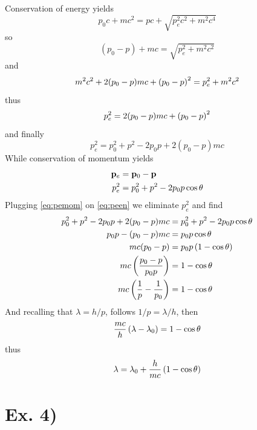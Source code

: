 \documentclass[oneside, 10pt, notitlepage]{book}
\begin{document}
Conservation of energy yields
\begin{equation}
    p_0 c + mc^2 = p c + \sqrt{p_e^2 c^2 + m^2 c^4}
\end{equation}
so
\begin{equation}
    (p_0-p) + mc = \sqrt{p_e^2  + m^2 c^2}
\end{equation}
and 
\begin{equation}
    m^2 c^2 + 2(p_0 - p)mc + \left(p_0 - p\right)^2 = p_e^2  + m^2 c^2
\end{equation}
thus 
\begin{equation}
    p_e^2 = 2(p_0 - p)mc + \left(p_0 - p\right)^2  
\end{equation}
and finally 
\begin{equation}\label{eq:peen}
    p_e^2 = p_0^2 + p^2 - 2p_0p + 2(p_0 - p)mc
\end{equation}
While conservation of momentum yields 
\begin{equation}\label{eq:pemom}
\begin{split}
    \vb{p}_e &= \vb{p}_0 - \vb{p} \\ 
    p_e^2 &= p_0^2 + p^2 - 2 p_0 p \cos \theta
\end{split}
\end{equation}
Plugging \eqref{eq:pemom} on \eqref{eq:peen} we eliminate \(p_e^2\) and find
\begin{equation} 
\begin{split}
    p_0^2 + p^2 - 2p_0p + 2(p_0 - p)mc &= p_0^2 + p^2 - 2 p_0 p \cos \theta \\
    p_0p - (p_0 - p)mc &=   p_0 p \cos \theta \\
    mc(p_0 - p) &= p_0 p \left(1-\cos\theta\right) \\
    mc \left(\frac{p_0-p}{p_0 p}\right) &= 1-\cos\theta \\
    mc \left(\frac{1}{p}-\frac{1}{p_0}\right) &= 1- \cos\theta
\end{split}
\end{equation}
And recalling that \(\lambda = h/p\), follows \(1/p = \lambda/h\), then 
\begin{equation}
    \frac{mc}{h} \left(\lambda-\lambda_0\right) = 1- \cos\theta
\end{equation}
thus 
\begin{equation}
    \lambda = \lambda_0 + \frac{h}{mc}\left(1-\cos\theta\right)
\end{equation}

\section*{Ex. 4)}
\end{document}
